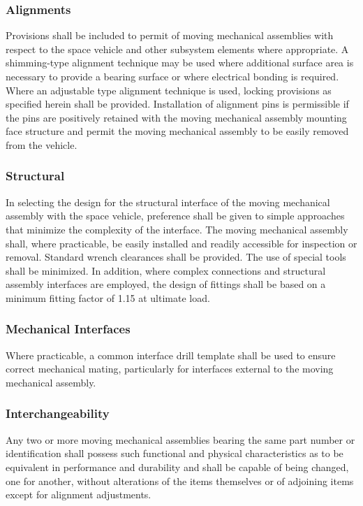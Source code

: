 \documentclass[12pt]{article}
\begin{document}
\subsubsection{Alignments} %
Provisions shall be included to permit of moving mechanical assemblies with respect to the space vehicle and other subsystem elements where appropriate. 
A shimming-type alignment technique may be used where additional surface area is necessary to provide a bearing surface or where electrical bonding is required. 
Where an adjustable type alignment technique is used, locking provisions as specified herein shall be provided. 
Installation of alignment pins is permissible if the pins are positively retained with the moving mechanical assembly mounting face structure and permit the moving mechanical assembly to be easily removed from the vehicle.

\subsubsection{Structural} %
In selecting the design for the structural interface of the moving mechanical assembly with the space vehicle, preference shall be given to simple approaches that minimize the complexity of the interface. 
The moving mechanical assembly shall, where practicable, be easily installed and readily accessible for inspection or removal. 
Standard wrench clearances shall be provided. 
The use of special tools shall be minimized. 
In addition, where complex connections and structural assembly interfaces are employed, the design of fittings shall be based on a minimum fitting factor of 1.15 at ultimate load.

\subsubsection{Mechanical Interfaces} %
Where practicable, a common interface drill template shall be used to ensure correct mechanical mating, particularly for interfaces external to the moving mechanical assembly.

\subsubsection{Interchangeability} %
Any two or more moving mechanical assemblies bearing the same part number or identification shall possess such functional and physical characteristics as to be equivalent in performance and durability and shall be capable of being changed, one for
another, without alterations of the items themselves or of adjoining items except for alignment adjustments.
\end{document}

